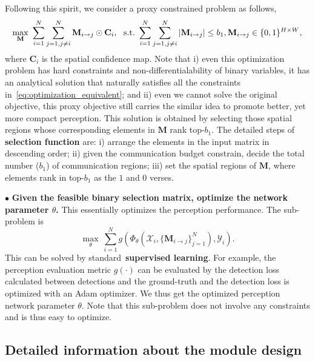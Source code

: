 \documentclass{article}
\begin{document}
Following this spirit, we consider a proxy constrained problem as follows,
\begin{equation*}
    \underset{\mathbf{M}}{\max}~\sum_{i=1}^{N}\sum_{j=1,j\neq i}^{N}  
    \mathbf{M}_{i\rightarrow j} \odot \mathbf{C}_i,~
    ~{\rm s.t.~}  \sum_{i=1}^{N}\sum_{j=1,j\neq i}^{N}|\mathbf{M}_{i\rightarrow j}| \leq b_1, \mathbf{M}_{i\rightarrow j}\in\{0,1\}^{H\times W},
\end{equation*}
where $\mathbf{C}_i$ is the spatial confidence map. Note that i) even this optimization problem has hard constraints and non-differentialability of binary variables, it has an analytical solution that naturally satisfies all the constraints in~\eqref{eq:optimization_equivalent}; and ii) even we cannot solve the original objective, this proxy objective still carries the similar idea to promote better, yet more compact perception. This solution is obtained by selecting those spatial regions whose corresponding elements in $\mathbf{M}$ rank top-$b_1$. The detailed steps of \textbf{selection function} are: i) arrange the elements in the input matrix in descending order; ii) given the communication budget constrain, decide the total number ($b_1$) of communication regions; iii) set the spatial regions of $\mathbf{M}$, where elements rank in top-$b_1$ as the $1$ and $0$ verses.


$\bullet $ \textbf{Given the feasible binary selection matrix, optimize the network parameter $\theta$.}  This essentially optimizes the perception performance. The sub-problem is
\begin{equation*}
    \underset{\theta}{\max}~\sum_{i=1}^{N} 
    g \left(\Phi_{\theta} \left(\mathcal{X}_i,\{\mathbf{M}_{i\rightarrow j}\}_{j=1}^N 
    \right), \mathcal{Y}_i  \right).
\end{equation*}
This can be solved by standard~\textbf{supervised learning}. For example, the perception evaluation metric $g(\cdot)$ can be evaluated by the  detection loss calculated between detections and the ground-truth and the detection loss is optimized with an Adam optimizer. We thus get the optimized perception network parameter $\theta$. Note that this sub-problem does not involve any constraints and is thus easy to optimize.





\subsection{Detailed information about the module design}
\end{document}
